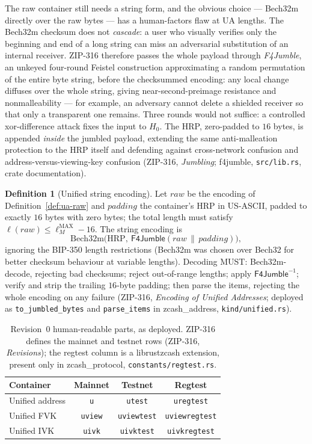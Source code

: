 \documentclass[11pt,a4paper]{article}
\theoremstyle{definition}
\newtheorem{definition}[theorem]{Definition}
\begin{document}
The raw container still needs a string form, and the obvious choice ---
Bech32m directly over the raw bytes --- has a human-factors flaw at UA
lengths. The Bech32m checksum does not \emph{cascade}: a user who visually
verifies only the beginning and end of a long string can miss an
adversarial substitution of an internal receiver. ZIP-316 therefore passes
the whole payload through \emph{F4Jumble}, an unkeyed four-round Feistel
construction approximating a random permutation of the entire byte string,
before the checksummed encoding: any local change diffuses over the whole
string, giving near-second-preimage resistance and nonmalleability ---
for example, an adversary cannot delete a shielded receiver so that only a
transparent one remains. Three rounds would not suffice: a controlled
xor-difference attack fixes the input to $H_0$. The HRP, zero-padded to
$16$ bytes, is appended \emph{inside} the jumbled payload, extending the
same anti-malleation protection to the HRP itself and defending against
cross-network confusion and address-versus-viewing-key confusion (ZIP-316,
\emph{Jumbling}; \textsf{f4jumble}, \texttt{src/lib.rs}, crate
documentation).

\begin{definition}[Unified string encoding]\label{def:ua-string}
Let $\mathit{raw}$ be the encoding of Definition~\ref{def:ua-raw} and
$\mathit{padding}$ the container's HRP in US-ASCII, padded to exactly $16$
bytes with zero bytes; the total length must satisfy
$\ell(\mathit{raw}) \le \ell^{\mathrm{MAX}}_M - 16$. The string encoding is
\[
\mathrm{Bech32m}\bigl(\mathrm{HRP},\
\mathsf{F4Jumble}(\mathit{raw} \,\|\, \mathit{padding})\bigr),
\]
ignoring the BIP-350 length restrictions (Bech32m was chosen over Bech32
for better checksum behaviour at variable lengths). Decoding MUST:
Bech32m-decode, rejecting bad checksums; reject out-of-range lengths;
apply $\mathsf{F4Jumble}^{-1}$; verify and strip the trailing $16$-byte
padding; then parse the items, rejecting the whole encoding on any failure
(ZIP-316, \emph{Encoding of Unified Addresses}; deployed as
\texttt{to\_jumbled\_bytes} and \texttt{parse\_items} in
\textsf{zcash\_address}, \texttt{kind/unified.rs}).
\end{definition}

\begin{table}[htbp]
\centering
\begin{tabular}{lccc}
\toprule
Container & Mainnet & Testnet & Regtest \\
\midrule
Unified address     & \texttt{u}     & \texttt{utest}     & \texttt{uregtest} \\
Unified FVK         & \texttt{uview} & \texttt{uviewtest} & \texttt{uviewregtest} \\
Unified IVK         & \texttt{uivk}  & \texttt{uivktest}  & \texttt{uivkregtest} \\
\bottomrule
\end{tabular}
\caption{Revision~0 human-readable parts, as deployed. ZIP-316 defines
the mainnet and testnet rows (ZIP-316, \emph{Revisions}); the regtest
column is a \textsf{librustzcash} extension, present only in
\textsf{zcash\_protocol}, \texttt{constants/regtest.rs}.}
\label{tab:hrps}
\end{table}
\end{document}

